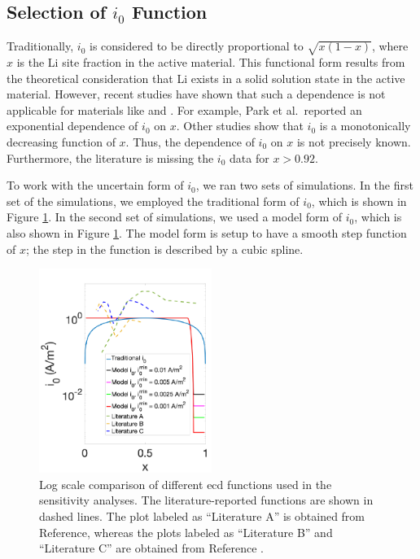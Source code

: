 \documentclass{article}
\begin{document}
\subsection{Selection of $i_0$ Function}

Traditionally, $i_0$ is considered to be directly proportional to
$\sqrt{x\left(1-x\right)}$, where $x$ is the Li site fraction in the
active
material\cite{newman1993,newman1994-2,newman1995-2,newman1996}. This
functional form results from the theoretical consideration that Li
exists in a solid solution state in the active material. However,
recent studies have shown that such a dependence is not applicable for
materials like \nca{}\cite{chueh2021} and \nmc{}\cite{mukherjee2017,chiang2020,tsai2018}. For
example, Park et al.\cite{chueh2021}\ reported an exponential
dependence of $i_0$ on $x$\cite{chueh2021}. Other studies show that
$i_0$ is a monotonically decreasing function of
$x$\cite{mukherjee2017,chiang2020,tsai2018}. Thus, the dependence of $i_0$ on $x$ is not
precisely known. Furthermore, the literature is missing the $i_0$ data
for $x>0.92$.

To work with the uncertain form of $i_0$, we ran two sets of
simulations. In the first set of the simulations, we employed the
traditional form of $i_0$, which is shown in Figure \ref{fig:i0_profiles}. In
the second set of simulations, we used a model form of $i_0$, which is
also shown in Figure \ref{fig:i0_profiles}. The model form is setup to have a
smooth step function of $x$; the step in the function is described by
a cubic spline.

\begin{figure}
  \begin{center}
    \includegraphics[width=0.5\textwidth]{i0_sensitivity.pdf}
  \end{center}
  \caption{Log scale comparison of different \gls{ecd} functions used
    in the sensitivity analyses. The literature-reported functions are
    shown in dashed lines.  The plot labeled as ``Literature A'' is
    obtained from Reference\cite{dees2008}, whereas the plots labeled
    as ``Literature B'' and ``Literature C'' are obtained from
    Reference \cite{tsai2018}.}
  \label{fig:i0_profiles}
\end{figure}
\end{document}
